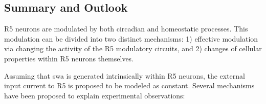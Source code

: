 \documentclass[../main.tex]{subfiles}
\begin{document}
\newpage
\subsection{Summary and Outlook}

R5 neurons are modulated by both circadian and homeostatic processes. This modulation can be divided into two distinct mechanisms: 1) effective modulation via changing the activity of the R5 modulatory circuits, and 2) changes of cellular properties within R5 neurons themselves.

Assuming that \gls{swa} is generated intrinsically within R5 neurons, the external input current to R5 is proposed to be modeled as constant.
Several mechanisms have been proposed to explain experimental observations:
\end{document}
